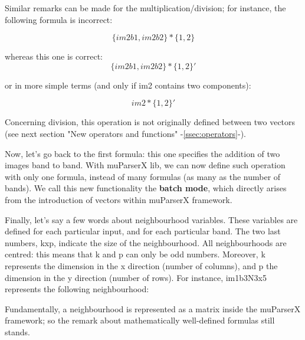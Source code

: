 Similar remarks can be made for the multiplication/division; 
for instance, the following formula is incorrect:

\begin{equation}
  \{im2b1,im2b2\} * \{1,2\}
\end{equation}

whereas this one is correct:
\begin{equation}
  \{im2b1,im2b2\} * \{1,2\}'
\end{equation}

or in more simple terms (and only if im2 contains two components): 

\begin{equation}
  im2* \{1,2\}'
\end{equation}

Concerning division, this operation is not originally defined between 
two vectors (see next section "New operators and functions" -\ref{ssec:operators}-).

\begin{center}
\end{center}

Now, let's go back to the first formula: this one specifies the addition 
of two images band to band. With muParserX lib, we can now define such 
operation with only one formula, instead of many formulas (as many as 
the number of bands). We call this new functionality the \textbf{batch mode}, 
which directly arises from the introduction of vectors within muParserX framework.

Finally, let's say a few words about neighbourhood variables. 
These variables are defined for each particular input, and for each 
particular band. The two last numbers, kxp, indicate the size of the 
neighbourhood. All neighbourhoods are centred: this means that k and p 
can only be odd numbers. Moreover, k represents the dimension in the 
x direction (number of columns), and p the dimension in the y direction 
(number of rows). For instance, im1b3N3x5 represents the following 
neighbourhood: 


Fundamentally, a neighbourhood is represented as a matrix inside the 
muParserX framework; so the remark about mathematically well-defined 
formulas still stands.

